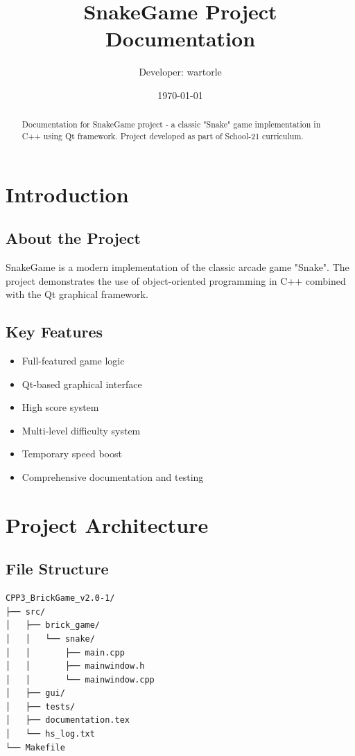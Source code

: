 \documentclass[12pt,a4paper]{article}
\title{SnakeGame Project Documentation}
\author{Developer: wartorle}
\date{\today}
\begin{document}
\maketitle
\begin{abstract}
Documentation for SnakeGame project - a classic "Snake" game implementation in C++ using Qt framework. Project developed as part of School-21 curriculum.
\end{abstract}

\tableofcontents

\section{Introduction}
\subsection{About the Project}
SnakeGame is a modern implementation of the classic arcade game "Snake". The project demonstrates the use of object-oriented programming in C++ combined with the Qt graphical framework.

\subsection{Key Features}
\begin{itemize}
    \item Full-featured game logic
    \item Qt-based graphical interface
    \item High score system
    \item Multi-level difficulty system
    \item Temporary speed boost
    \item Comprehensive documentation and testing
\end{itemize}

\section{Project Architecture}

\subsection{File Structure}
\begin{verbatim}
CPP3_BrickGame_v2.0-1/
├── src/
│   ├── brick_game/
│   │   └── snake/
│   │       ├── main.cpp
│   │       ├── mainwindow.h
│   │       └── mainwindow.cpp
│   ├── gui/
│   ├── tests/
│   ├── documentation.tex
│   └── hs_log.txt
└── Makefile
\end{verbatim}
\end{document}
